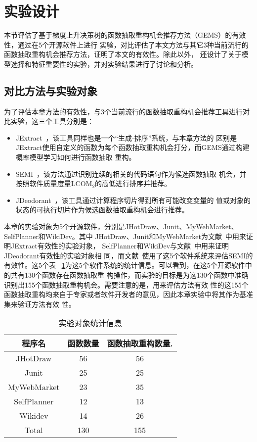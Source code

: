 \section{实验设计}
本节评估了基于梯度上升决策树的函数抽取重构机会推荐方法（GEMS）的有效性，通过在5个开源软件上进行
实验，对比评估了本文方法与其它3种当前流行的函数抽取重构机会推荐方法，证明了本文的有效性。除此以外，
还设计了关于模型选择和特征重要性的实验，并对实验结果进行了讨论和分析。

\subsection{对比方法与实验对象}
为了评估本章方法的有效性，与3个当前流行的函数抽取重构机会推荐工具进行对比实验，这三个工具分别是：
\begin{itemize}
  \item JExtract~\cite{silva:ICPC14,silva:CoRR15}，该工具同样也是一个``生成-排序''系统，与本章方法的
区别是JExtract使用自定义的函数为每个函数抽取重构机会打分，而GEMS通过构建概率模型学习如何进行函数抽取
重构。
  \item SEMI~\cite{charalampidou2016identifying}，该方法通过识别连续的相关的代码语句作为候选函数抽取
机会，并按照软件质量度量LCOM$_2$的高低进行排序并推荐。
  \item JDeodorant~\cite{tsantalis2011identification}，该工具通过计算程序切片得到所有可能改变变量的
  值或对象的状态的可执行切片作为候选函数抽取重构机会进行推荐。
\end{itemize}

本章的实验对象为5个开源软件，分别是JHotDraw、Junit、MyWebMarket、SelfPlanner和WikiDev。其中
JHotDraw、Junit和MyWebMarket为文献~\cite{silva:ICPC14}中用来证明JExtract有效性的实验对象，
SelfPlanner和WikiDev与文献~\cite{tsantalis2011identification}中用来证明JDeodorant有效性的实验对象相
同，而文献~\cite{charalampidou2016identifying}使用了这5个软件系统来评估SEMI的有效性。这5个表
~\ref{benchmark}为这5个软件系统的统计信息。可以看到，在这5个开源软件中的共有130个函数存在函数抽取重
构操作，而实验的目标是为这130个函数中准确识别出155个函数抽取重构机会。需要注意的是，用来评估方法有效
性的这155个函数抽取重构均来自于专家或者软件开发者的意见，因此本章实验中将其作为基准集来验证方法有效
性。

\begin{table}[!t]
  \scriptsize
  \renewcommand{\arraystretch}{1.3}
  \caption{实验对象统计信息}
  \label{benchmark}
  \centering
  \begin{tabular}{ccc}
  \toprule 
  程序名 &函数数量 &函数抽取重构数量.\\ \midrule
  JHotDraw &56 &56 \\ 
  Junit &25 &25 \\ 
  MyWebMarket &23 &35 \\ 
  SelfPlanner &12 &13 \\ 
  Wikidev &14 &26 \\ \midrule
  Total &130 &155 \\ 
  \bottomrule
  \end{tabular}
  \end{table}

